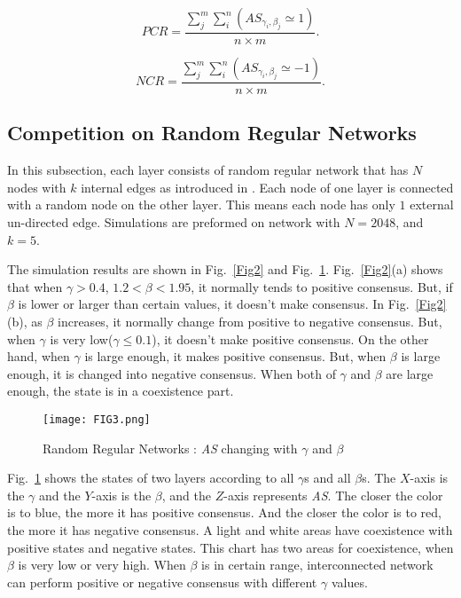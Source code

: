 \documentclass[english]{cccconf}
\begin{document}
\begin{equation}
PCR = \frac{{\sum\limits_j^m {\sum\limits_i^n {(A{S_{{\gamma _i},{\beta _j}}} \simeq  1)} } }}{{n \times m}}.
\end{equation}

\begin{equation}
NCR = \frac{{\sum\limits_j^m {\sum\limits_i^n {(A{S_{{\gamma _i},{\beta _j}}} \simeq   - 1)} } }}{{n \times m}}.
\end{equation}

\subsection{Competition on Random Regular Networks}
In this subsection, each layer consists of random regular network that has $N$ nodes with $k$ internal edges as introduced in \cite{kimsangwoo2012, bela2001}. Each node of one layer is connected with a random node on the other layer. This means each node has only $1$ external un-directed edge. Simulations are preformed on network with $N=2048$, and $k = 5$. 

The simulation results are shown in Fig.~\ref{Fig2} and Fig.~\ref{Fig3}. Fig.~\ref{Fig2}(a) shows that when $\gamma > 0.4$, $1.2 < \beta < 1.95$, it normally tends to positive consensus. But, if $\beta$ is lower or larger than certain values, it doesn't make consensus.
In Fig.~\ref{Fig2}(b), as $\beta$ increases, it normally change from positive to negative consensus. But, when $\gamma$ is very low($\gamma \le 0.1$), it doesn't make positive consensus. On the other hand, when $\gamma$ is large enough, it makes positive consensus. But, when $\beta$ is large enough, it is changed into negative consensus. When both of $\gamma$ and $\beta$ are large enough, the state is in a coexistence part.
 
\begin{figure}[!htb]
	\centering
	\texttt{[image: FIG3.png]}
	\caption{Random Regular Networks : \textit{AS} changing with $\gamma$ and $\beta$}
	\label{Fig3}
\end{figure}

Fig.~\ref{Fig3} shows the states of two layers according to all $\gamma$s and all $\beta$s. The $X$-axis is the $\gamma$ and the $Y$-axis is the $\beta$, and the $Z$-axis represents \textit{AS}. The closer the color is to blue, the more it has positive consensus. And the closer the color is to red, the more it has negative consensus. A light and white areas have coexistence with positive states and negative states. This chart has two areas for coexistence, when $\beta$ is very low or very high. When $\beta$ is in certain range, interconnected network can perform positive or negative consensus with different $\gamma$ values.     
\end{document}

